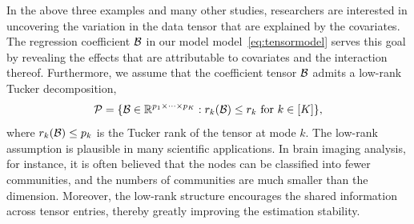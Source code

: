\documentclass[twoside]{article}
\theoremstyle{plain}
\theoremstyle{definition}
\begin{document}
In the above three examples and many other studies, researchers are interested in uncovering the variation in the data tensor that are explained by the covariates. The regression coefficient $\mathcal{B}$ in our model model~\eqref{eq:tensormodel} serves this goal by revealing the effects that are attributable to covariates and the interaction thereof.  %
Furthermore, we assume that the coefficient tensor $\mathcal{B}$ admits a low-rank Tucker decomposition,
\begin{equation}\label{eq:rank}
\mathcal{P}=\{\mathcal{B}\in\mathbb{R}^{p_1\times \cdots \times p_K}: r_k(\mathcal{B})\leq r_k \text{ for } k\in[K]\},
\end{equation}
where $r_k(\mathcal{B})\leq p_k$ is the Tucker rank of the tensor at mode $k$. The low-rank assumption is plausible in many scientific applications. In brain imaging analysis, for instance, it is often believed that the nodes can be classified into fewer communities, and the numbers of communities are much smaller than the dimension. Moreover, the low-rank structure encourages the shared information across tensor entries, thereby greatly improving the estimation stability.  
\end{document}
